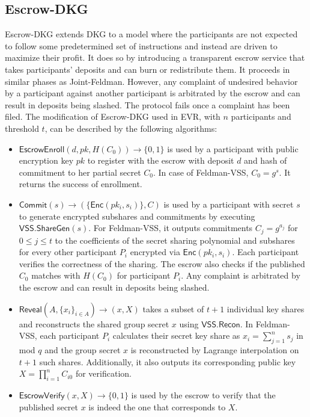 \documentclass[letterpaper,twocolumn,10pt]{article}
\theoremstyle{definition}
\theoremstyle{remark}
\begin{document}
\subsection{Escrow-DKG}
\label{appendix:edkg}
Escrow-DKG \cite{david2019rational} extends DKG to a model where the participants are not expected to follow some predetermined set of instructions and instead are driven to maximize their profit. It does so by introducing a transparent escrow service that takes participants' deposits and can burn or redistribute them. It proceeds in similar phases as Joint-Feldman. However, any complaint of undesired behavior by a participant against another participant is arbitrated by the escrow and can result in deposits being slashed. The protocol fails once a complaint has been filed. The modification of Escrow-DKG used in EVR, with $n$ participants and threshold $t$, can be described by the following algorithms:
\begin{itemize}
    \item $\mathsf{EscrowEnroll}(d, pk, H(C_{0})) \rightarrow \{0,1\}$ is used by a participant with public encryption key $pk$ to register with the escrow with deposit $d$ and hash of commitment to her partial secret $C_{0}$. In case of Feldman-VSS, $C_{0} = g^{s}$. It returns the success of enrollment.
    
    \item $\mathsf{Commit}(s) \rightarrow (\{\mathsf{Enc}(pk_i, s_{i})\}, C)$ is used by a participant with secret $s$ to generate encrypted subshares and commitments by executing $\mathsf{VSS.ShareGen}(s)$. For Feldman-VSS, it outputs commitments $C_j = g^{a_j}$ for $0 \le j \le t$ to the coefficients of the secret sharing polynomial and subshares for every other participant $P_i$ encrypted via $\mathsf{Enc}(pk_i, s_{i})$. Each participant verifies the correctness of the sharing. The escrow also checks if the published $C_{0}$ matches with $H(C_{0})$ for participant $P_i$. Any complaint is arbitrated by the escrow and can result in deposits being slashed.
    
    \item $\mathsf{Reveal}(A, \{x_i\}_{i \in A}) \rightarrow (x, X)$ takes a subset of $t + 1$ individual key shares and reconstructs the shared group secret $x$ using $\mathsf{VSS.Recon}$. In Feldman-VSS, each participant $P_i$ calculates their secret key share as $x_i = \sum_{j=1}^{n} s_j$ in mod $q$ and the group secret $x$ is reconstructed by Lagrange interpolation on $t + 1$ such shares. Additionally, it also outputs its corresponding public key $X = \prod_{i=1}^{n} C_{i0}$ for verification.
    
    \item $\mathsf{EscrowVerify}(x, X)\rightarrow\{0,1\}$ is used by the escrow to verify that the published secret $x$ is indeed the one that corresponds to $X$.
\end{itemize}
\end{document}
